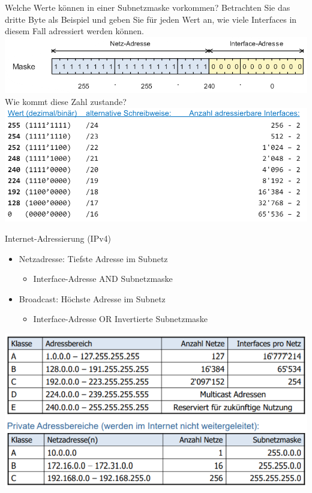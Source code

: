 \begin{example}
    Welche Werte können in einer Subnetzmaske vorkommen? Betrachten Sie das dritte Byte als Beispiel und geben Sie für jeden Wert an, wie viele Interfaces in diesem Fall adressiert werden können. \\
        \includegraphics[width=0.5\linewidth]{images/subnetzmaske_example.png}\\
    Wie kommt diese Zahl zustande?\\
    \includegraphics[width=0.5\linewidth]{images/subnetzmaske_bsp_2.png}
\end{example}

\begin{KR}{Internet-Adressierung (IPv4)}
    \begin{itemize}
        \item Netzadresse: Tiefste Adresse im Subnetz 
        \begin{itemize}
            \item Interface-Adresse AND Subnetzmaske
        \end{itemize}
        \item Broadcast: Höchste Adresse im Subnetz 
        \begin{itemize}
            \item Interface-Adresse OR Invertierte Subnetzmaske
        \end{itemize}
    \end{itemize}
        \includegraphics[width=1\linewidth]{images/ipv4.png}
\end{KR}

